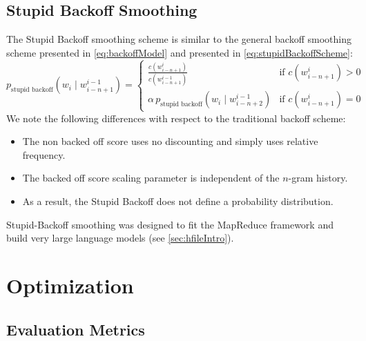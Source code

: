 \subsection{Stupid Backoff Smoothing}
\label{sec:stupidBackoffSmoothing}

The Stupid Backoff smoothing scheme is similar to
the general backoff smoothing scheme presented in \autoref{eq:backoffModel}
and presented in \autoref{eq:stupidBackoffScheme}:
%
\begin{equation}
  p_{\text{stupid backoff}}(w_i \mid w_{i - n + 1}^{i - 1}) =
  \begin{cases}
    \frac{c(w_{i - n + 1}^i)}{c(w_{i - n + 1}^{i - 1})} & \text{if } c(w_{i - n + 1}^i) > 0 \\
    \alpha \, p_{\text{stupid backoff}}(w_i \mid w_{i - n + 2}^{i - 1}) & \text{if } c(w_{i - n + 1}^i) = 0
  \end{cases}
  \label{eq:stupidBackoffScheme}  
\end{equation}
%
We note the following differences with respect to the traditional backoff
scheme:
%
\begin{itemize}
  \item The non backed off score uses no discounting and simply uses relative frequency.
  \item The backed off score scaling parameter is independent of
    the $n$-gram history.
  \item As a result, the Stupid Backoff does not define a probability distribution.
\end{itemize}
%
Stupid-Backoff smoothing was designed to fit the MapReduce framework
and build very large language models (see \autoref{sec:hfileIntro}).


\section{Optimization}
\label{sec:optimization}

    \subsection{Evaluation Metrics}
    \label{sec:evaluationMetrics}

